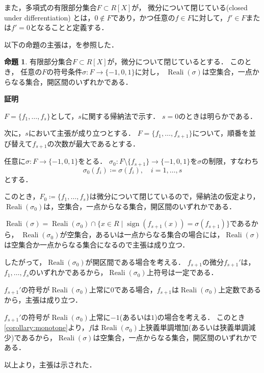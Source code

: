 \documentclass[uplatex, dvipdfmx]{jsarticle}
\makeatletter
\numberwithin{equation}{section}
\renewenvironment{proof}[1][\proofname]{\par
  \pushQED{\qed}%
  \normalfont \topsep6\p@\@plus6\p@\relax
  \trivlist
  \item\relax
  {\bfseries
  #1\@addpunct{.}}\hspace\labelsep\ignorespaces
}{
  \popQED\endtrivlist\@endpefalse
}
\newcommand{\map}[3]{{#1}\colon{#2}\rightarrow{#3}}
\DeclareMathOperator{\Reali}{Reali}
\DeclareMathOperator{\sign}{sign}
\theoremstyle{definition}
\newtheorem{proposition}[definition]{命題}
\renewcommand{\proofname}{\textbf{証明}}
\makeatother
\begin{document}
また，多項式の有限部分集合$F \subset R[X]$が，
微分について閉じている(closed under differentiation)
とは，$0 \not \in F$であり，かつ任意の$f \in F$に対して，$f' \in F$または$f'=0$となることと定義する．


以下の命題の主張は，\cite[Lemma 5.33.]{MR2248869}を参照した．

\begin{proposition}\label{proposition:Thom}
     有限部分集合$F \subset R[X]$が，微分について閉じているとする．
     このとき， 任意の$F$の符号条件$\map{\sigma}{F}{\{-1,0,1\}}$に対し，
     $\Reali(\sigma)$は空集合，一点からなる集合，開区間のいずれかである．
\end{proposition}

\begin{proof}
     $F = \{f_1, \dots, f_s\}$として，$s$に関する帰納法で示す．
     $s = 0$のときは明らかである．
     
     次に，$s$において主張が成り立つとする．
     $F = \{f_1, \dots, f_{s+1}\}$について，順番を並び替えて$f_{s+1}$の次数が最大であるとする．

     任意に$\map{\sigma}{F}{\{-1,0,1\}}$をとる．
     $\map{\sigma_0}{F \setminus \{f_{s+1}\}}{\{-1,0,1\}}$を$\sigma$の制限，すなわち
     \begin{equation}
          \sigma_0(f_i) \coloneqq \sigma(f_i), \quad i=1, \dots, s
     \end{equation}
     とする．

     このとき，$F_0 \coloneqq \{f_1, \dots, f_{s}\}$は微分について閉じているので，帰納法の仮定より，
     $\Reali(\sigma_0)$は，空集合，一点からなる集合，開区間のいずれかである．

     $\Reali(\sigma) = \Reali({\sigma_0}) \cap \{x \in R \mid \sign(f_{s+1}(x)) = \sigma(f_{s+1})\}$であるから，
     $\Reali({\sigma_0})$が空集合，あるいは一点からなる集合の場合には，$\Reali(\sigma)$は空集合か一点からなる集合になるので主張は成り立つ．

     したがって，$\Reali({\sigma_0})$が開区間である場合を考える．
     $f_{s+1}$の微分$f_{s+1}'$は，$f_1, \dots, f_s$のいずれかであるから，$\Reali({\sigma_0})$上符号は一定である．

     $f_{s+1}'$の符号が$\Reali({\sigma_0})$上常に$0$である場合，$f_{s+1}$は$\Reali({\sigma_0})$上定数であるから，主張は成り立つ．

     $f_{s+1}'$の符号が$\Reali({\sigma_0})$上常に$-1$(あるいは$1$)の場合を考える．
     このとき\cref{corollary:monotone}より，$f$は$\Reali({\sigma_0})$上狭義単調増加(あるいは狭義単調減少)であるから，$\Reali(\sigma)$は空集合，一点からなる集合，開区間のいずれかである．

     以上より，主張は示された．
\end{proof}
\end{document}
